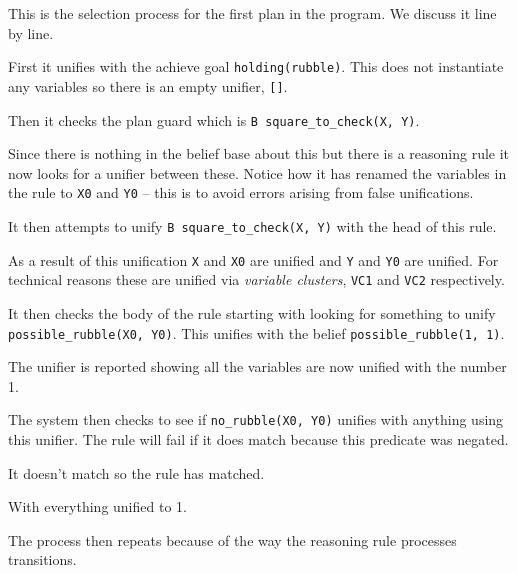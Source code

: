 This is the selection process for the first plan in the program.  We discuss it line by line.
\begin{itemize}
\item First it unifies with the achieve goal \texttt{holding(rubble)}.  This does not instantiate any variables so there is an empty unifier, \texttt{[]}.  
\item Then it checks the plan guard which is \lstinline{B square_to_check(X, Y)}.  
\item Since there is nothing in the belief base about this but there is a reasoning rule it now looks for a  unifier between these.  Notice how it has renamed the variables in the rule to \texttt{X0} and \texttt{Y0} -- this is to avoid errors arising from false unifications.  
\item It then attempts to unify \lstinline{B square_to_check(X, Y)} with the head of this rule.
\item As a result of this unification \texttt{X} and \texttt{X0} are unified and \texttt{Y} and \texttt{Y0} are unified.  For technical reasons these are unified via \emph{variable clusters}, \texttt{VC1} and \texttt{VC2} respectively.
\begin{sloppypar}
\item It then checks the body of the rule starting with looking for something to unify \texttt{possible\_rubble(X0, Y0)}.  This unifies with the belief \texttt{possible\_rubble(1, 1)}.
\end{sloppypar}
\item The unifier is reported showing all the variables are now unified with the number 1.
\item The system then checks to see if \texttt{no\_rubble(X0, Y0)} unifies with anything using this unifier.  The rule will fail if it does match because this predicate was negated.
\item It doesn't match so the rule has matched.
\item With everything unified to 1.
\item The process then repeats because of the way the reasoning rule processes transitions.
\end{itemize}

